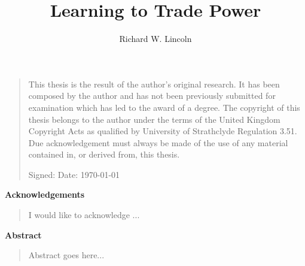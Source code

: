 \documentclass{strath_thesis}
\title{Learning to Trade Power}
\author{Richard W. Lincoln}
\begin{document}
\maketitle
\newpage

\setcounter{page}{1}

\thispagestyle{plain}
\begin{quote}
This thesis is the result of the author's original research.  It has been
composed by the author and has not been previously submitted for examination
which has led to the award of a degree.
The copyright of this thesis belongs to the author under the terms of the
United Kingdom Copyright Acts as qualified by University of Strathclyde
Regulation 3.51. Due acknowledgement must always be made of the use of any
material contained in, or derived from, this thesis.

\vspace{1cm}
Signed:\hspace{7.6cm} Date: \today
\end{quote}
\newpage

\thispagestyle{plain}
\begin{center}
\vspace*{1.5cm}
{\Large \bfseries Acknowledgements}
\end{center}
\vspace{0.5cm}
\begin{quote}
I would like to acknowledge ...
\end{quote}
\newpage

\thispagestyle{plain}
\begin{center}
  \vspace*{1.5cm}
  {\Large \bfseries  Abstract}
\end{center}
\vspace{0.5cm}
\begin{quote}
Abstract goes here...
\end{quote}

\tableofcontents
\newpage
\listoffigures
\newpage
\listoftables
\newpage
{}
\setcounter{page}{1}


\onehalfspacing







%






%


\end{document}

